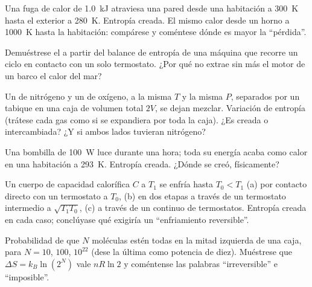 \begin{exercise}[$\star\star$]\label{exo:b1:second-law-entropy:7}
Una fuga de calor de \qty{1.0}{kJ} atraviesa una pared desde una
habitación a \qty{300}{K} hasta el exterior a \qty{280}{K}. Entropía
creada. El mismo calor desde un horno a \qty{1000}{K} hasta la habitación:
compárese y coméntese dónde es mayor la ``pérdida''.
\end{exercise}

\begin{exercise}[$\star\star$]\label{exo:b1:second-law-entropy:8}
Demuéstrese el  a partir del balance de entropía de una
máquina que recorre un ciclo en contacto con un solo termostato. ¿Por qué
no extrae sin más el motor de un barco el calor del mar?
\end{exercise}

\begin{exercise}[$\star\star$]\label{exo:b1:second-law-entropy:9}
Un  de nitrógeno y un  de oxígeno, a la misma $T$ y la misma $P$,
separados por un tabique en una caja de volumen total $2V$, se dejan mezclar. Variación
de entropía (trátese cada gas como si se expandiera por toda la caja).
¿Es creada o intercambiada? ¿Y si ambos lados tuvieran nitrógeno?
\end{exercise}

\begin{exercise}[$\star\star\star$]\label{exo:b1:second-law-entropy:10}
Una bombilla de \qty{100}{W} luce durante una hora; toda su energía acaba
como calor en una habitación a \qty{293}{K}. Entropía creada. ¿Dónde se
creó, físicamente?
\end{exercise}

\begin{exercise}[$\star\star\star$]\label{exo:b1:second-law-entropy:11}
Un cuerpo de capacidad calorífica $C$ a $T_1$ se enfría hasta $T_0 < T_1$
(a) por contacto directo con un termostato a $T_0$, (b) en dos etapas a
través de un termostato intermedio a $\sqrt{T_1T_0}$, (c) a través de un
continuo de termostatos. Entropía creada en cada caso; conclúyase qué
exigiría un ``enfriamiento reversible''.
\end{exercise}

\begin{exercise}[$\star\star\star$]\label{exo:b1:second-law-entropy:12}
Probabilidad de que $N$ moléculas estén todas en la mitad izquierda de una
caja, para $N = 10$, $100$, $10^{22}$ (dese la última como potencia de
diez). Muéstrese que $\Delta S = k_B\ln(2^N)$ vale $nR\ln2$ y coméntense las
palabras ``irreversible'' e ``imposible''.
\end{exercise}

